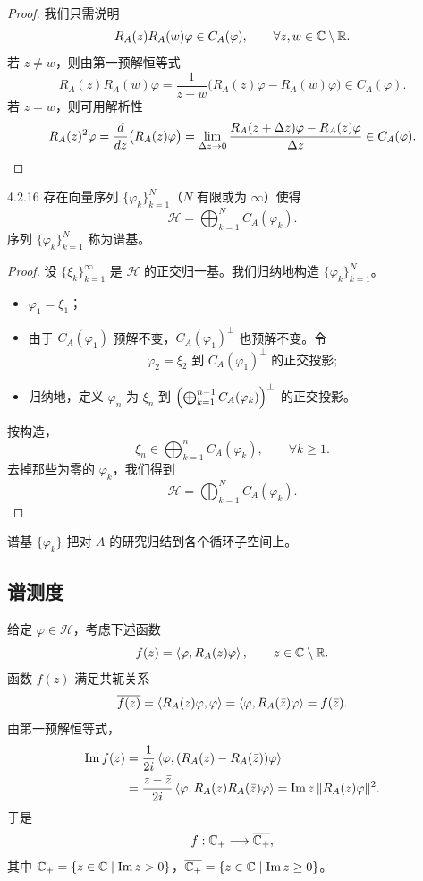 \begin{proof}
  我们只需说明
  \[
  R_A(z)R_A(w)\varphi\in C_A(\varphi),\qquad\forall z,w\in\mathbb{C}\setminus\mathbb{R}.
  \]
  若 $z\ne w$，则由第一预解恒等式
  \[
  R_A(z)R_A(w)\varphi=\frac{1}{z-w}\bigl(R_A(z)\varphi-R_A(w)\varphi\bigr)\in C_A(\varphi).
  \]
  若 $z=w$，则可用解析性
  \[
  R_A(z)^2\varphi=\frac{d}{d z}\bigl(R_A(z)\varphi\bigr)
  =\lim_{\Delta z\to 0}\frac{R_A(z+\Delta z)\varphi-R_A(z)\varphi}{\Delta z}\in C_A(\varphi).
  \]
\end{proof}

\begin{theorem}{4.2.16}
  存在向量序列 $\{\varphi_k\}_{k=1}^{N}$（$N$ 有限或为 $\infty$）使得
  \[
  \mathcal{H}=\bigoplus_{k=1}^{N}C_A(\varphi_k).
  \]
  序列 $\{\varphi_k\}_{k=1}^{N}$ 称为谱基。
\end{theorem}

\begin{proof}
  设 $\{\xi_k\}_{k=1}^{\infty}$ 是 $\mathcal{H}$ 的正交归一基。我们归纳地构造 $\{\varphi_k\}_{k=1}^{N}$。
  \begin{itemize}[leftmargin=2em,itemsep=1pt]
    \item $\varphi_1=\xi_1$；
    \item 由于 $C_A(\varphi_1)$ 预解不变，$C_A(\varphi_1)^\perp$ 也预解不变。令
    \[
    \varphi_2=\xi_2\text{ 到 }C_A(\varphi_1)^\perp\text{ 的正交投影};
    \]
    \item 归纳地，定义 $\varphi_n$ 为 $\xi_n$ 到 $\Bigl(\bigoplus_{k=1}^{n-1}C_A(\varphi_k)\Bigr)^\perp$ 的正交投影。
  \end{itemize}
  按构造，
  \[
  \xi_n\in\bigoplus_{k=1}^{n}C_A(\varphi_k),\qquad\forall k\ge 1.
  \]
  去掉那些为零的 $\varphi_k$，我们得到
  \[
  \mathcal{H}=\bigoplus_{k=1}^{N}C_A(\varphi_k).
  \]
\end{proof}

谱基 $\{\varphi_k\}$ 把对 $A$ 的研究归结到各个循环子空间上。

\subsection{谱测度}

给定 $\varphi\in\mathcal{H}$，考虑下述函数
\[
f(z)=\left\langle \varphi,R_A(z)\varphi\right\rangle,\qquad z\in\mathbb{C}\setminus\mathbb{R}.
\]
函数 $f(z)$ 满足共轭关系
\[
\overline{f(z)}=\left\langle R_A(z)\varphi,\varphi\right\rangle=\left\langle \varphi,R_A(\bar z)\varphi\right\rangle=f(\bar z).
\]
由第一预解恒等式，
\begin{align*}
\operatorname{Im} f(z)
&=\frac{1}{2i}\left\langle \varphi,(R_A(z)-R_A(\bar z))\varphi\right\rangle\\
&=\frac{z-\bar z}{2i}\left\langle \varphi,R_A(z)R_A(\bar z)\varphi\right\rangle
=\operatorname{Im} z\,\lVert R_A(z)\varphi\rVert^2.
\end{align*}
于是
\[
f:\mathbb{C}_+\longrightarrow\overline{\mathbb{C}_+},
\]
其中 $\mathbb{C}_+=\{z\in\mathbb{C}\mid\operatorname{Im} z>0\}$，$\overline{\mathbb{C}_+}=\{z\in\mathbb{C}\mid\operatorname{Im} z\ge 0\}$。

